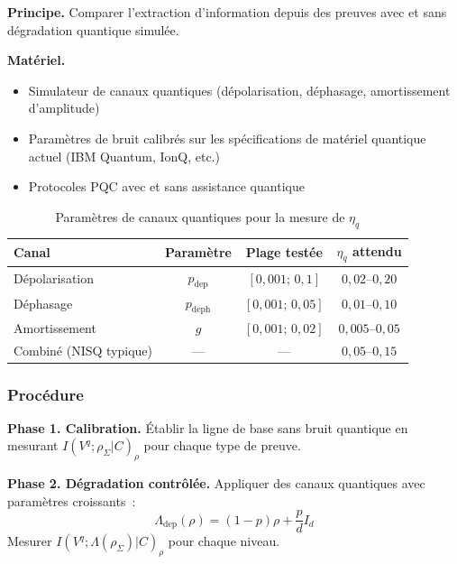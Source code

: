 \begin{sloppypar}
\noindent\textbf{Principe.} Comparer l'extraction d'information depuis des
preuves avec et sans d\'egradation quantique simul\'ee.

\noindent\textbf{Mat\'eriel.}
\begin{itemize}
\item Simulateur de canaux quantiques (d\'epolarisation, d\'ephasage,
      amortissement d'amplitude)
\item Param\`etres de bruit calibr\'es sur les sp\'ecifications de mat\'eriel
      quantique actuel (IBM Quantum, IonQ, etc.)
\item Protocoles PQC avec et sans assistance quantique
\end{itemize}

\begin{table}[htbp]
\centering
\caption{Param\`etres de canaux quantiques pour la mesure de $\eta_q$}
\label{tab:val_canaux_quantiques}
\begin{tabular}{@{}lccc@{}}
\toprule
\textbf{Canal} & \textbf{Param\`etre} & \textbf{Plage test\'ee} & \textbf{$\eta_q$ attendu} \\
\midrule
D\'epolarisation & $p_{\mathrm{dep}}$ & $[0{,}001;\,0{,}1]$ & $0{,}02$--$0{,}20$ \\
D\'ephasage & $p_{\mathrm{deph}}$ & $[0{,}001;\,0{,}05]$ & $0{,}01$--$0{,}10$ \\
Amortissement & $g$ & $[0{,}001;\,0{,}02]$ & $0{,}005$--$0{,}05$ \\
Combin\'e (NISQ typique) & --- & --- & $0{,}05$--$0{,}15$ \\
\bottomrule
\end{tabular}
\end{table}

\subsubsection{Proc\'edure}
\label{subsubsec:procedure_eta_q}

\noindent\textbf{Phase 1. Calibration.}
\'Etablir la ligne de base sans bruit quantique en mesurant
$I(V^q; \rho_\Sigma|C)_\rho$ pour chaque type de preuve.

\noindent\textbf{Phase 2. D\'egradation contr\^ol\'ee.}
Appliquer des canaux quantiques avec param\`etres croissants~:
\begin{equation}
\Lambda_{\mathrm{dep}}(\rho) = (1-p)\rho + \frac{p}{d}I_d
\label{eq:canal_depolarisant_op}
\end{equation}
Mesurer $I(V^q; \Lambda(\rho_\Sigma)|C)_\rho$ pour chaque niveau.


\end{sloppypar}
